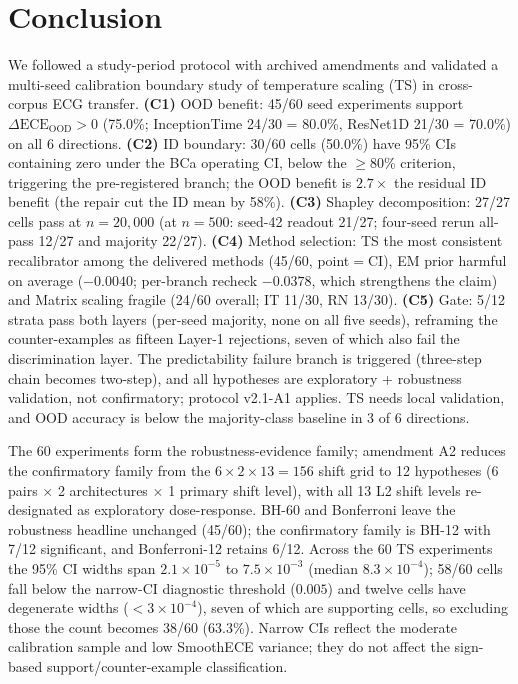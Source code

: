 \documentclass[final,5p,times,nonatbib]{elsarticle}
\begin{document}
\section{Conclusion}
\label{sec:conclusion}
We followed a study-period protocol with archived amendments and
validated a multi-seed calibration boundary study of temperature scaling
(TS) in cross-corpus ECG transfer. \textbf{(C1)}
OOD benefit: 45/60 seed experiments support
$\Delta\text{ECE}_{\text{OOD}}>0$ (75.0\%; InceptionTime 24/30 = 80.0\%,
ResNet1D 21/30 = 70.0\%) on all 6 directions. \textbf{(C2)} ID boundary:
30/60 cells (50.0\%) have 95\% CIs containing zero under the BCa
operating CI, below the $\geq$80\%
criterion, triggering the pre-registered branch; the OOD benefit is
$2.7\times$ the residual ID benefit (the repair cut the ID mean by
58\%). \textbf{(C3)} Shapley decomposition: 27/27
cells pass at $n=20{,}000$ (at $n=500$: seed-42 readout 21/27; four-seed
rerun all-pass 12/27 and majority 22/27). \textbf{(C4)} Method
selection: TS the most consistent recalibrator among the delivered
methods (45/60, point$=$CI), EM
prior harmful on average ($-0.0040$; per-branch recheck $-0.0378$, which
strengthens the claim) and Matrix scaling fragile (24/60
overall; IT 11/30, RN 13/30). \textbf{(C5)} Gate: 5/12 strata pass both layers
(per-seed majority, none on all five seeds),
reframing the counter-examples as fifteen Layer-1 rejections, seven of which
also fail the discrimination layer. The
predictability failure branch is triggered (three-step chain becomes
two-step), and all hypotheses are exploratory + robustness validation,
not confirmatory; protocol v2.1-A1 applies. TS needs local
validation, and OOD accuracy is below the
majority-class baseline in 3 of 6 directions.

The 60 experiments form the robustness-evidence family; amendment A2
reduces the confirmatory family from the $6 \times 2 \times 13 = 156$
shift grid to 12 hypotheses (6 pairs $\times$ 2 architectures $\times$ 1
primary shift level), with all 13 L2 shift levels re-designated as
exploratory dose-response. BH-60 and Bonferroni
leave the robustness headline unchanged (45/60); the confirmatory family
is BH-12 with 7/12 significant, and Bonferroni-12
retains 6/12. Across the 60 TS experiments the 95\% CI widths span
$2.1\times10^{-5}$ to $7.5\times10^{-3}$ (median $8.3\times10^{-4}$);
58/60 cells fall below the narrow-CI diagnostic threshold ($0.005$) and
twelve cells have degenerate widths ($<3\times10^{-4}$), seven of which
are supporting cells, so
excluding those the count becomes 38/60 (63.3\%). Narrow CIs reflect
the moderate calibration sample and low SmoothECE variance; they do not
affect the sign-based support/counter-example classification.
\end{document}
